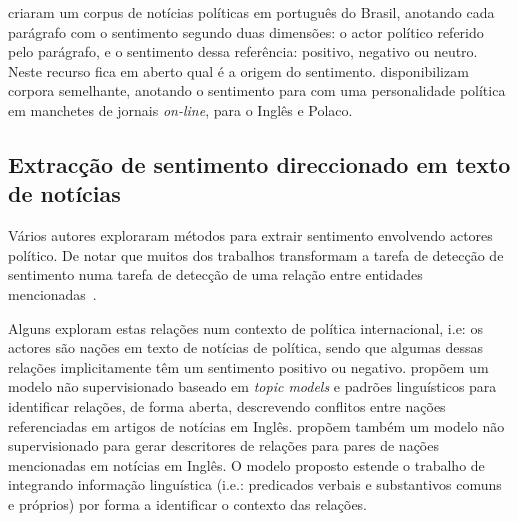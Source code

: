 \documentclass[a4paper, twocolumn, 11pt, twoside]{article}
\begin{document}
\cite{de-arruda-etal-2015-annotated} criaram um corpus de notícias políticas em português do Brasil, anotando cada parágrafo com o sentimento segundo duas dimensões: o actor político referido pelo parágrafo, e o sentimento dessa referência: positivo, negativo ou neutro. Neste recurso fica em aberto qual é a origem do sentimento. \cite{BARANIAK20213627} disponibilizam corpora semelhante, anotando o sentimento para com uma personalidade política em manchetes de jornais \textit{on-line}, para o Inglês e Polaco.

\subsection{Extracção de sentimento direccionado em texto de notícias}

Vários autores exploraram métodos para extrair sentimento envolvendo actores político. De notar que muitos dos trabalhos transformam a tarefa de detecção de sentimento numa tarefa de detecção de uma relação entre entidades mencionadas~\citep{bassignana-plank-2022-mean}.

Alguns exploram estas relações num contexto de política internacional, i.e: os actores são nações em texto de notícias de política, sendo que algumas dessas relações implicitamente têm um sentimento positivo ou negativo. \cite{oconnor-etal-2013-learning} propõem um modelo não supervisionado baseado em \textit{topic models} e padrões linguísticos para identificar relações, de forma aberta, descrevendo conflitos entre nações referenciadas em artigos de notícias em Inglês. \cite{han-etal-2019-permanent} propõem também um modelo não supervisionado para gerar descritores de relações para pares de nações mencionadas em notícias em Inglês.
O modelo proposto estende o trabalho de \cite{iyyer-etal-2016-feuding} integrando informação linguística (i.e.: predicados verbais e substantivos comuns e próprios) por forma a identificar o contexto das relações.
\end{document}
